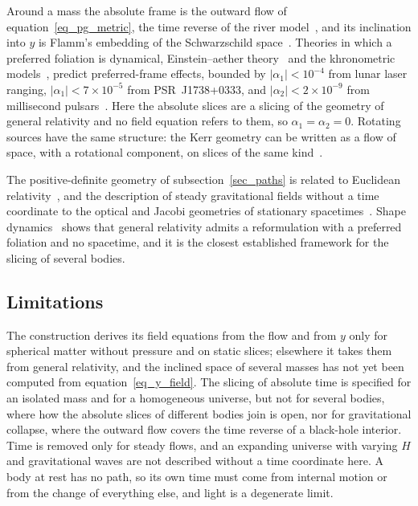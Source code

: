 \documentclass{iopjournal}
\begin{document}
Around a mass the absolute frame is the outward flow of equation~\eqref{eq_pg_metric}, the time reverse of the river model~\cite{HamiltonLisle2008}, and its inclination into $y$ is Flamm's embedding of the Schwarzschild space~\cite{Flamm1916}. Theories in which a preferred foliation is dynamical, Einstein--aether theory~\cite{JacobsonMattingly2001} and the khronometric models~\cite{BlasPujolasSibiryakov2011}, predict preferred-frame effects, bounded by $|\alpha_1|<10^{-4}$ from lunar laser ranging, $|\alpha_1|<7\times10^{-5}$ from PSR~J1738+0333, and $|\alpha_2|<2\times10^{-9}$ from millisecond pulsars~\cite{Will2014}. Here the absolute slices are a slicing of the geometry of general relativity and no field equation refers to them, so $\alpha_1=\alpha_2=0$. Rotating sources have the same structure: the Kerr geometry can be written as a flow of space, with a rotational component, on slices of the same kind~\cite{Doran2000}.

The positive-definite geometry of subsection~\ref{sec_paths} is related to Euclidean relativity~\cite{Montanus2001,Almeida2001}, and the description of steady gravitational fields without a time coordinate to the optical and Jacobi geometries of stationary spacetimes~\cite{GibbonsZermelo2009,Gibbons2016Jacobi}. Shape dynamics~\cite{GomesGrybKoslowski2011} shows that general relativity admits a reformulation with a preferred foliation and no spacetime, and it is the closest established framework for the slicing of several bodies.

\subsection{Limitations}

The construction derives its field equations from the flow and from $y$ only for spherical matter without pressure and on static slices; elsewhere it takes them from general relativity, and the inclined space of several masses has not yet been computed from equation~\eqref{eq_y_field}. The slicing of absolute time is specified for an isolated mass and for a homogeneous universe, but not for several bodies, where how the absolute slices of different bodies join is open, nor for gravitational collapse, where the outward flow covers the time reverse of a black-hole interior. Time is removed only for steady flows, and an expanding universe with varying $H$ and gravitational waves are not described without a time coordinate here. A body at rest has no path, so its own time must come from internal motion or from the change of everything else, and light is a degenerate limit.
\end{document}
